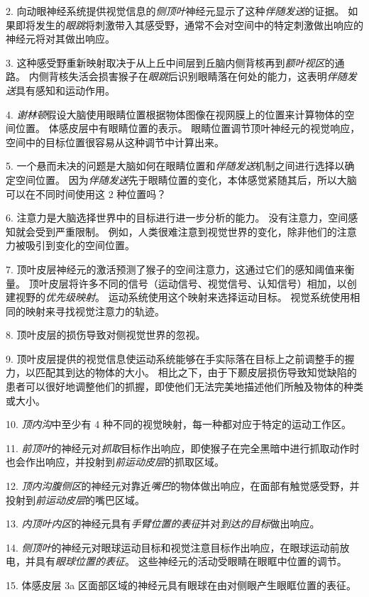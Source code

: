 2. 向动眼神经系统提供视觉信息的\textit{侧顶叶}神经元显示了这种\textit{伴随发送}的证据。
如果即将发生的\textit{眼跳}将刺激带入其感受野，通常不会对空间中的特定刺激做出响应的神经元将对其做出响应。


3. 这种感受野重新映射取决于从上丘中间层到丘脑内侧背核再到\textit{额叶视区}的通路。
内侧背核失活会损害猴子在\textit{眼跳}后识别眼睛落在何处的能力，这表明\textit{伴随发送}具有感知和运动作用。


4. \textit{谢林顿}假设大脑使用眼睛位置根据物体图像在视网膜上的位置来计算物体的空间位置。
体感皮层中有眼睛位置的表示。
眼睛位置调节顶叶神经元的视觉响应，空间中的目标位置很容易从这种调节中计算出来。


5. 一个悬而未决的问题是大脑如何在眼睛位置和\textit{伴随发送}机制之间进行选择以确定空间位置。
因为\textit{伴随发送}先于眼睛位置的变化，本体感觉紧随其后，所以大脑可以在不同时间使用这 2 种位置吗？


6. 注意力是大脑选择世界中的目标进行进一步分析的能力。
没有注意力，空间感知就会受到严重限制。
例如，人类很难注意到视觉世界的变化，除非他们的注意力被吸引到变化的空间位置。


7. 顶叶皮层神经元的激活预测了猴子的空间注意力，这通过它们的感知阈值来衡量。
顶叶皮层将许多不同的信号（运动信号、视觉信号、认知信号）相加，以创建视野的\textit{优先级映射}。
运动系统使用这个映射来选择运动目标。
视觉系统使用相同的映射来寻找视觉注意力的轨迹。


8. 顶叶皮层的损伤导致对侧视觉世界的忽视。


9. 顶叶皮层提供的视觉信息使运动系统能够在手实际落在目标上之前调整手的握力，以匹配其到达的物体的大小。
相比之下，由于下颞皮层损伤导致知觉缺陷的患者可以很好地调整他们的抓握，即使他们无法完美地描述他们所触及物体的种类或大小。


10. \textit{顶内沟}中至少有 4 种不同的视觉映射，每一种都对应于特定的运动工作区。


11. \textit{前顶叶}的神经元对\textit{抓取}目标作出响应，即使猴子在完全黑暗中进行抓取动作时也会作出响应，并投射到\textit{前运动皮层}的抓取区域。


12. \textit{顶内沟腹侧区}的神经元对靠近\textit{嘴巴}的物体做出响应，在面部有触觉感受野，并投射到\textit{前运动皮层}的嘴巴区域。 


13. \textit{内顶叶内区}的神经元具有\textit{手臂位置的表征}并对\textit{到达的目标}做出响应。


14. \textit{侧顶叶}的神经元对眼球运动目标和视觉注意目标作出响应，在眼球运动前放电，并具有\textit{眼球位置的表征}。
这些神经元的活动受眼睛在眼眶中位置的调节。


15. 体感皮层 3a 区面部区域的神经元具有眼球在由对侧眼产生眼眶位置的表征。

